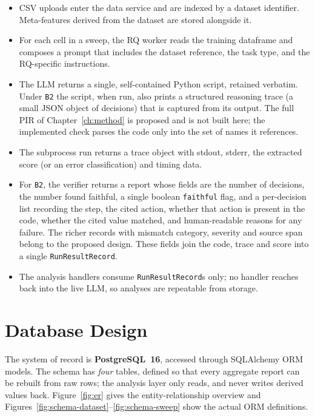 \begin{itemize}
    \item CSV uploads enter the data service and are indexed by a
    dataset identifier. Meta-features derived from the dataset are
    stored alongside it.
    \item For each cell in a sweep, the RQ worker reads the training
    dataframe and composes a prompt that includes the dataset
    reference, the task type, and the RQ-specific instructions.
    \item The LLM returns a single, self-contained Python script,
    retained verbatim. Under \texttt{B2} the script, when run, also
    prints a structured reasoning trace (a small JSON object of
    decisions) that is captured from its output. The full PIR of
    Chapter~\ref{ch:method} is proposed and is not built here; the
    implemented check parses the code only into the set of names it
    references.
    \item The subprocess run returns a trace object with stdout, stderr,
    the extracted score (or an error classification) and timing
    data.
    \item For \texttt{B2}, the verifier returns a report whose fields
    are the number of decisions, the number found faithful, a single
    boolean \texttt{faithful} flag, and a per-decision list recording
    the step, the cited action, whether that action is present in the
    code, whether the cited value matched, and human-readable reasons
    for any failure. The richer records with mismatch category,
    severity and source span belong to the proposed design. These
    fields join the code, trace and score into a single
    \texttt{RunResultRecord}.
    \item The analysis handlers consume \texttt{RunResultRecord}s
    only; no handler reaches back into the live LLM, so analyses are
    repeatable from storage.
\end{itemize}

\section{Database Design}

The system of record is \textbf{PostgreSQL~16}, accessed through
SQLAlchemy ORM models. The schema has \emph{four} tables, defined so
that every aggregate report can be rebuilt from raw rows; the
analysis layer only reads, and never writes derived values back.
Figure~\ref{fig:er} gives the entity-relationship overview and
Figures~\ref{fig:schema-dataset}--\ref{fig:schema-sweep} show the
actual ORM definitions.

